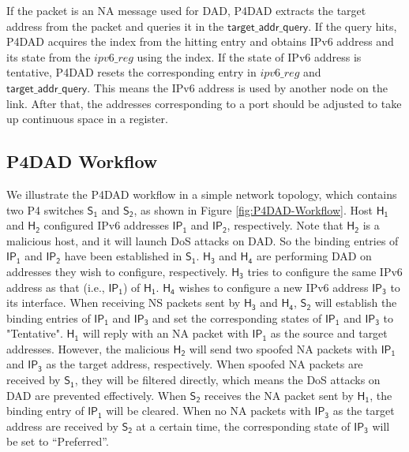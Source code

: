 \documentclass[journal]{IEEEtran}
\begin{document}
        If the packet is an NA message used for DAD, P4DAD extracts the target address from the packet and queries it in the $\mathsf{target\_addr\_query}$. If the query hits, P4DAD acquires the index from the hitting entry and obtains IPv6 address and its state from the $ipv6\_reg$ using the index. If the state of IPv6 address is tentative, P4DAD resets the corresponding entry in $ipv6\_reg$ and $\mathsf{target\_addr\_query}$. This means the IPv6 address is used by another node on the link. After that, the addresses corresponding to a port should be adjusted to take up continuous space in a register.



    \subsection{P4DAD Workflow}
        We illustrate the P4DAD workflow in a simple network topology, which contains two P4 switches $\mathsf{S_1}$ and $\mathsf{S_2}$, as shown in Figure \ref{fig:P4DAD-Workflow}. Host $\mathsf{H_1}$ and $\mathsf{H_2}$ configured IPv6 addresses $\mathsf{IP_1}$ and $\mathsf{IP_2}$, respectively. Note that $\mathsf{H_2}$ is a malicious host, and it will launch DoS attacks on DAD. So the binding entries of $\mathsf{IP_1}$ and $\mathsf{IP_2}$ have been established in $\mathsf{S_1}$.
        $\mathsf{H_3}$ and $\mathsf{H_4}$ are performing DAD on addresses they wish to configure, respectively. $\mathsf{H_3}$ tries to configure the same IPv6 address as that (i.e., $\mathsf{IP_1}$) of $\mathsf{H_1}$. $\mathsf{H_4}$ wishes to configure a new IPv6 address $\mathsf{IP_3}$ to its interface.
        When receiving NS packets sent by $\mathsf{H_3}$ and $\mathsf{H_4}$, $\mathsf{S_2}$ will establish the binding entries of $\mathsf{IP_1}$ and $\mathsf{IP_3}$ and set the corresponding states of $\mathsf{IP_1}$ and $\mathsf{IP_3}$ to "Tentative". $\mathsf{H_1}$ will reply with an NA packet with $\mathsf{IP_1}$ as the source and target addresses. However, the malicious $\mathsf{H_2}$ will send two spoofed NA packets with $\mathsf{IP_1}$ and $\mathsf{IP_3}$ as the target address, respectively. When spoofed NA packets are received by $\mathsf{S_1}$, they will be filtered directly, which means the DoS attacks on DAD are prevented effectively. When $\mathsf{S_2}$ receives the NA packet sent by $\mathsf{H_1}$, the binding entry of $\mathsf{IP_1}$ will be cleared. When no NA packets with $\mathsf{IP_3}$ as the target address are received by $\mathsf{S_2}$ at a certain time, the corresponding state of $\mathsf{IP_3}$ will be set to ``Preferred''.  
\end{document}
